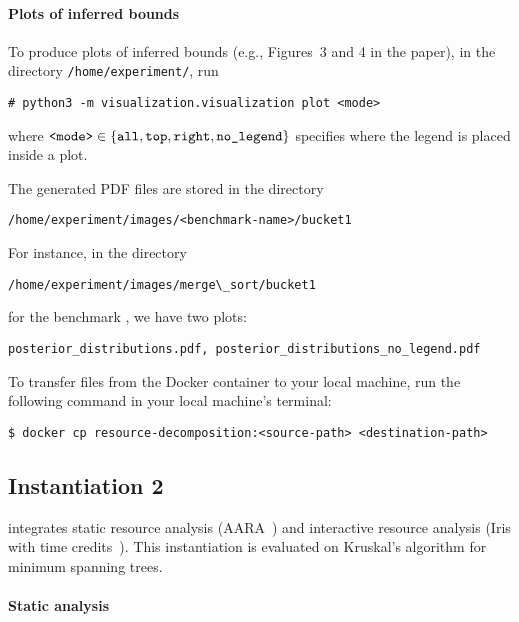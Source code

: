 \paragraph{Plots of inferred bounds}

To produce plots of inferred bounds (e.g., Figures~3 and 4 in the paper), in the
directory \texttt{/home/experiment/}, run
\begin{verbatim}
# python3 -m visualization.visualization plot <mode>
\end{verbatim}
where $\texttt{<mode>} \in \{ {\texttt{all}, \texttt{top}, \texttt{right},
    \texttt{no\_legend}} \}$ specifies where the legend is placed inside a plot.

The generated PDF files are stored in the directory
\begin{verbatim}
/home/experiment/images/<benchmark-name>/bucket1
\end{verbatim}
%
For instance, in the directory
\begin{verbatim}
/home/experiment/images/merge\_sort/bucket1
\end{verbatim}
for the benchmark \mergesort{}, we have two plots:
\begin{verbatim}
posterior_distributions.pdf, posterior_distributions_no_legend.pdf
\end{verbatim}

To transfer files from the Docker container to your local machine, run the
following command in your local machine's terminal:
\begin{verbatim}
$ docker cp resource-decomposition:<source-path> <destination-path>
\end{verbatim}

\subsection{Instantiation 2}
\label{sec:step-by-step-instructions:instantiation-2}

 integrates static resource analysis
(AARA~\citep{Hoffmann2011a,Hoffmann2017}) and interactive resource analysis
(Iris with time credits~\citep{Chargueraud2019}).
%
This instantiation is evaluated on Kruskal's algorithm for minimum spanning
trees.

\paragraph{Static analysis}


